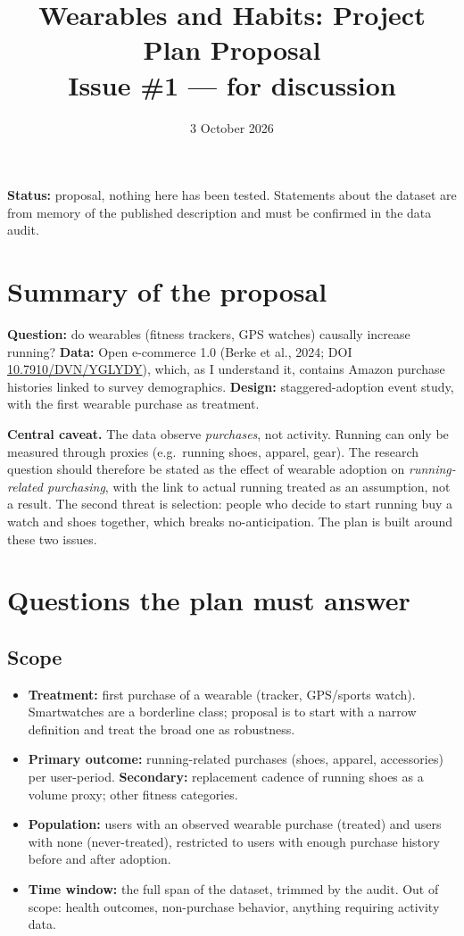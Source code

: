 \documentclass[11pt]{article}
\title{Wearables and Habits: Project Plan Proposal\\\large Issue \#1 --- for discussion}
\date{3 October 2026}
\author{}
\begin{document}
\maketitle

\noindent\textbf{Status:} proposal, nothing here has been tested. Statements about the dataset are from memory of the
published description and must be confirmed in the data audit.

\section{Summary of the proposal}
\textbf{Question:} do wearables (fitness trackers, GPS watches) causally increase running?
\textbf{Data:} Open e-commerce 1.0 (Berke et al., 2024; DOI \href{https://doi.org/10.7910/DVN/YGLYDY}{10.7910/DVN/YGLYDY}),
which, as I understand it, contains Amazon purchase histories linked to survey demographics.
\textbf{Design:} staggered-adoption event study, with the first wearable purchase as treatment.

\textbf{Central caveat.} The data observe \emph{purchases}, not activity. Running can only be measured through proxies
(e.g.\ running shoes, apparel, gear). The research question should therefore be stated as the effect of wearable
adoption on \emph{running-related purchasing}, with the link to actual running treated as an assumption, not a result.
The second threat is selection: people who decide to start running buy a watch and shoes together, which breaks
no-anticipation. The plan is built around these two issues.

\section{Questions the plan must answer}

\subsection*{Scope}
\begin{itemize}
  \item \textbf{Treatment:} first purchase of a wearable (tracker, GPS/sports watch). Smartwatches are a borderline
        class; proposal is to start with a narrow definition and treat the broad one as robustness.
  \item \textbf{Primary outcome:} running-related purchases (shoes, apparel, accessories) per user-period.
        \textbf{Secondary:} replacement cadence of running shoes as a volume proxy; other fitness categories.
  \item \textbf{Population:} users with an observed wearable purchase (treated) and users with none (never-treated),
        restricted to users with enough purchase history before and after adoption.
  \item \textbf{Time window:} the full span of the dataset, trimmed by the audit. Out of scope: health outcomes,
        non-purchase behavior, anything requiring activity data.
\end{itemize}
\end{document}
